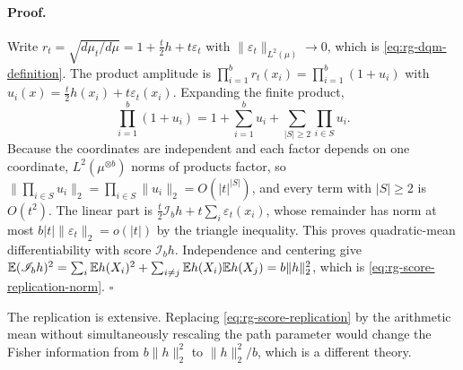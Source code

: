\paragraph{Proof.}
Write \(r_t=\sqrt{d\mu_t/d\mu}=1+\tfrac t2h+t\varepsilon_t\) with
\(\lVert\varepsilon_t\rVert_{L^2(\mu)}\to0\), which is
\eqref{eq:rg-dqm-definition}.  The product amplitude is
\(\prod_{i=1}^br_t(x_i)=\prod_{i=1}^b(1+u_i)\) with
\(u_i(x)=\tfrac t2h(x_i)+t\varepsilon_t(x_i)\).  Expanding the finite product,
\begin{equation}
 \prod_{i=1}^b(1+u_i)
 =1+\sum_{i=1}^bu_i
 +\sum_{\lvert S\rvert\geq2}\prod_{i\in S}u_i .
 \label{eq:rg-product-amplitude-expansion}
\end{equation}
Because the coordinates are independent and each factor depends on one
coordinate, \(L^2(\mu^{\otimes b})\) norms of products factor, so
\(\lVert\prod_{i\in S}u_i\rVert_2=\prod_{i\in S}\lVert u_i\rVert_2
=O(\lvert t\rvert^{\lvert S\rvert})\), and every term with
\(\lvert S\rvert\geq2\) is \(O(t^2)\).  The linear part is
\(\tfrac t2\mathscr I_bh+t\sum_i\varepsilon_t(x_i)\), whose remainder has norm at
most \(b\lvert t\rvert\lVert\varepsilon_t\rVert_2=o(\lvert t\rvert)\) by the
triangle inequality.  This proves quadratic-mean differentiability with score
\(\mathscr I_bh\).  Independence and centering give
\(\mathbb E(\mathscr I_bh)^2=\sum_i\mathbb E h(X_i)^2+\sum_{i\neq j}\mathbb E h(X_i)\mathbb E h(X_j)
=b\lVert h\rVert_2^2\), which is
\eqref{eq:rg-score-replication-norm}. \(\square\)

The replication is extensive.  Replacing \eqref{eq:rg-score-replication} by the
arithmetic mean without simultaneously rescaling the path parameter would change
the Fisher information from \(b\lVert h\rVert_2^2\) to
\(\lVert h\rVert_2^2/b\), which is a different theory.

